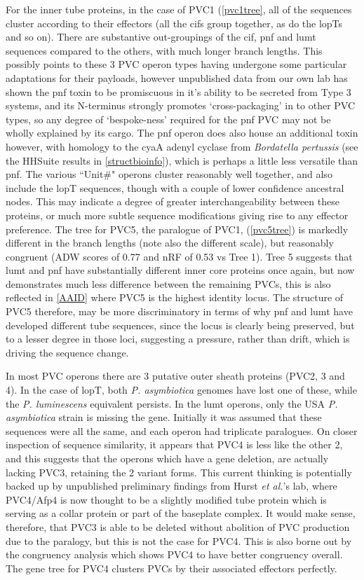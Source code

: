 For the inner tube proteins, in the case of PVC1 (\vref{pvc1tree}, all of the sequences cluster according to their effectors (all the cifs group together, as do the lopTs and so on). There are substantive out-groupings of the cif, pnf and lumt sequences compared to the others, with much longer branch lengths. This possibly points to these 3 PVC operon types having undergone some particular adaptations for their payloads, however unpublished data from our own lab has shown the pnf toxin to be promiscuous in it's ability to be secreted from Type 3 systems, and its N-terminus strongly promotes `cross-packaging' in to other PVC types, so any degree of `bespoke-ness' required for the pnf PVC may not be wholly explained by its cargo. The pnf operon does also house an additional toxin however, with homology to the cyaA adenyl cyclase from \emph{Bordatella pertussis} (see the HHSuite results in \vref{structbioinfo}), which is perhaps a little less versatile than pnf. The various ``Unit\#" operons cluster reasonably well together, and also include the lopT sequences, though with a couple of lower confidence ancestral nodes. This may indicate a degree of greater interchangeability between these proteins, or much more subtle sequence modifications giving rise to any effector preference. The tree for PVC5, the paralogue of PVC1, (\vref{pvc5tree}) is markedly different in the branch lengths (note also the different scale), but reasonably congruent (ADW scores of 0.77 and nRF of 0.53 vs Tree 1). Tree 5 suggests that lumt and pnf have substantially different inner core proteins once again, but now demonstrates much less difference between the remaining PVCs, this is also reflected in \vref{AAID} where PVC5 is the highest identity locus. The structure of PVC5 therefore, may be more discriminatory in terms of why pnf and lumt have developed different tube sequences, since the locus is clearly being preserved, but to a lesser degree in those loci, suggesting a pressure, rather than drift, which is driving the sequence change.

In most PVC operons there are 3 putative outer sheath proteins (PVC2, 3 and 4). In the case of lopT, both \emph{P. asymbiotica} genomes have lost one of these, while the \emph{P. luminescens} equivalent persists. In the lumt operons, only the USA \emph{P. asymbiotica} strain is missing the gene. Initially it was assumed that these sequences were all the same, and each operon had triplicate paralogues. On closer inspection of sequence similarity, it appears that PVC4 is less like the other 2, and this suggests that the operons which have a gene deletion, are actually lacking PVC3, retaining the 2 variant forms. This current thinking is potentially backed up by unpublished preliminary findings from Hurst \emph{et al.}'s lab, where PVC4/Afp4 is now thought to be a slightly modified tube protein which is serving as a collar protein or part of the baseplate complex. It would make sense, therefore, that PVC3 is able to be deleted without abolition of PVC production due to the paralogy, but this is not the case for PVC4. This is also borne out by the congruency analysis which shows PVC4 to have better congruency overall. The gene tree for PVC4 clusters PVCs by their associated effectors perfectly.

